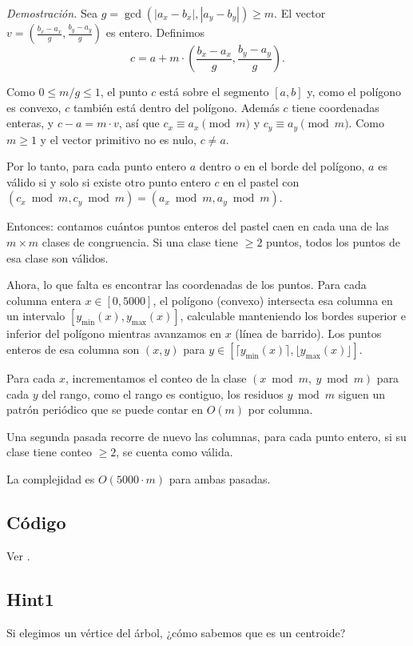 \emph{Demostración.} Sea $g = \gcd(|a_x - b_x|, |a_y - b_y|) \geq m$. El vector $v = \left(\frac{b_x - a_x}{g}, \frac{b_y - a_y}{g}\right)$ es entero. Definimos
\[
c = a + m \cdot \left(\frac{b_x - a_x}{g}, \frac{b_y - a_y}{g}\right).
\]

Como $0 \leq m/g \leq 1$, el punto $c$ está sobre el segmento $[a,b]$ y, como el polígono es convexo, $c$ también está dentro del polígono. Además $c$ tiene coordenadas enteras, y $c - a = m \cdot v$, así que $c_x \equiv a_x \pmod{m}$ y $c_y \equiv a_y \pmod{m}$. Como $m \geq 1$ y el vector primitivo no es nulo, $c \neq a$.

Por lo tanto, para cada punto entero $a$ dentro o en el borde del polígono, $a$ es válido si y solo si existe otro punto entero $c$ en el pastel con $(c_x \bmod m, c_y \bmod m) = (a_x \bmod m, a_y \bmod m)$.

Entonces: contamos cuántos puntos enteros del pastel caen en
cada una de las $m \times m$ clases de congruencia. Si una
clase tiene $\geq 2$ puntos, todos los puntos de esa clase son válidos.

Ahora, lo que falta es encontrar las coordenadas de los puntos. Para cada columna entera $x \in [0,5000]$, el polígono (convexo) intersecta esa columna en un intervalo
$[y_{\min}(x), y_{\max}(x)]$, calculable manteniendo los bordes superior e inferior del polígono mientras avanzamos en $x$ (línea de barrido). Los puntos enteros de esa columna son $(x,y)$ para $y \in [\lceil y_{\min}(x)\rceil, \lfloor y_{\max}(x)\rfloor]$.

Para cada $x$, incrementamos el conteo de la clase
$(x \bmod m,\ y \bmod m)$ para cada $y$ del rango, como el
rango es contiguo, los residuos $y \bmod m$ siguen un patrón
periódico que se puede contar en $O(m)$ por columna.

Una segunda pasada recorre de nuevo las columnas, para cada
punto entero, si su clase tiene conteo $\geq 2$, se cuenta como válida.

La complejidad es $O(5000 \cdot m)$ para ambas pasadas.
\subsection*{Código}
Ver .

\subsection*{Hint1}
Si elegimos un vértice del árbol, ¿cómo sabemos que es un centroide?
